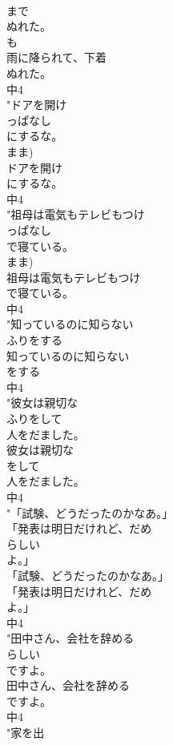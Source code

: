\documentclass[8pt]{extreport}
\begin{document}
\begin{CJK}{UTF8}{min}
\\	まで
\\	ぬれた。
\\	も 
\\	雨に降られて、下着
\\	ぬれた。
\\	中4
\\	"ドアを開け
\\	っぱなし
\\	にするな。
\\	まま)	
\\	ドアを開け
\\	にするな。
\\	中4
\\	"祖母は電気もテレビもつけ
\\	っぱなし
\\	で寝ている。
\\	まま)	
\\	祖母は電気もテレビもつけ
\\	で寝ている。
\\	中4
\\	"知っているのに知らない
\\	ふりをする
\\	知っているのに知らない
\\	をする
\\	中4
\\	"彼女は親切な
\\	ふりをして
\\	人をだました。
\\	彼女は親切な
\\	をして
\\	人をだました。
\\	中4
\\	"「試験、どうだったのかなあ。」
\\	「発表は明日だけれど、だめ
\\	らしい
\\	よ。」
\\	「試験、どうだったのかなあ。」
\\	「発表は明日だけれど、だめ
\\	よ。」
\\	中4
\\	"田中さん、会社を辞める
\\	らしい
\\	ですよ。
\\	田中さん、会社を辞める
\\	ですよ。
\\	中4
\\	"家を出

\end{CJK}
\end{document}
